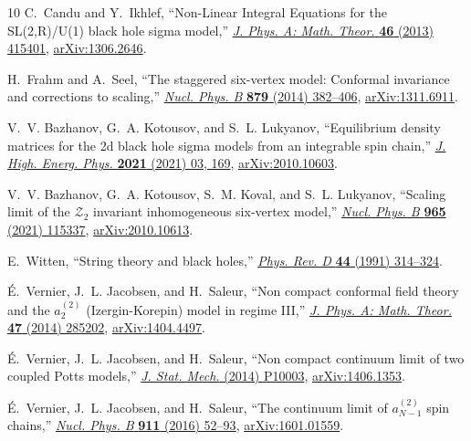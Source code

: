 \documentclass[12pt]{article}
\numberwithin{equation}{section}
\begin{document}
\begin{thebibliography}{10}
		C.~Candu and Y.~Ikhlef, ``{N}on-{L}inear {I}ntegral {E}quations for the
		{SL}(2,{R})/{U}(1) black hole sigma model,''
		\href{http://dx.doi.org/10.1088/1751-8113/46/41/415401}{{\em J. Phys. A:
				Math. Theor.} {\bfseries 46} (2013) 415401},
		\href{http://arxiv.org/abs/1306.2646}{{\ttfamily arXiv:1306.2646}}.
		
		H.~Frahm and A.~Seel, ``{T}he staggered six-vertex model: {C}onformal
		invariance and corrections to scaling,''
		\href{http://dx.doi.org/10.1016/j.nuclphysb.2013.12.015}{{\em Nucl. Phys. B}
			{\bfseries 879} (2014) 382--406},
		\href{http://arxiv.org/abs/1311.6911}{{\ttfamily arXiv:1311.6911}}.
		
		V.~V. Bazhanov, G.~A. Kotousov, and S.~L. Lukyanov, ``Equilibrium density
		matrices for the 2d black hole sigma models from an integrable spin chain,''
		\href{http://dx.doi.org/10.1007/JHEP03(2021)169}{{\em J. High. Energ. Phys.}
			{\bfseries 2021} (2021) 03, 169},
		\href{http://arxiv.org/abs/2010.10603}{{\ttfamily arXiv:2010.10603}}.
		
		V.~V. Bazhanov, G.~A. Kotousov, S.~M. Koval, and S.~L. Lukyanov, ``Scaling
		limit of the {$\mathcal{Z}_2$} invariant inhomogeneous six-vertex model,''
		\href{http://dx.doi.org/10.1016/j.nuclphysb.2021.115337}{{\em Nucl. Phys. B}
			{\bfseries 965} (2021) 115337},
		\href{http://arxiv.org/abs/2010.10613}{{\ttfamily arXiv:2010.10613}}.
		
		E.~Witten, ``{S}tring theory and black holes,''
		\href{http://dx.doi.org/10.1103/PhysRevD.44.314}{{\em Phys. Rev. D}
			{\bfseries 44} (1991) 314--324}.
		
		{\'E}.~Vernier, J.~L. Jacobsen, and H.~Saleur, ``{N}on compact conformal field
		theory and the $a_2^{(2)}$ ({I}zergin-{K}orepin) model in regime {III},''
		\href{http://dx.doi.org/10.1088/1751-8113/47/28/285202}{{\em J. Phys. A:
				Math. Theor.} {\bfseries 47} (2014) 285202},
		\href{http://arxiv.org/abs/1404.4497}{{\ttfamily arXiv:1404.4497}}.
		
		{\'E}.~Vernier, J.~L. Jacobsen, and H.~Saleur, ``{N}on compact continuum limit
		of two coupled {P}otts models,''
		\href{http://dx.doi.org/10.1088/1742-5468/2014/10/P10003}{{\em J. Stat.
				Mech.} (2014) P10003}, \href{http://arxiv.org/abs/1406.1353}{{\ttfamily
				arXiv:1406.1353}}.
		
		{\'E}.~Vernier, J.~L. Jacobsen, and H.~Saleur, ``{T}he continuum limit of
		$a_{N-1}^{(2)}$ spin chains,''
		\href{http://dx.doi.org/https://doi.org/10.1016/j.nuclphysb.2016.07.026}{{\em
				Nucl. Phys. B} {\bfseries 911} (2016) 52--93},
		\href{http://arxiv.org/abs/1601.01559}{{\ttfamily arXiv:1601.01559}}.
		

\end{thebibliography}
\end{document}
